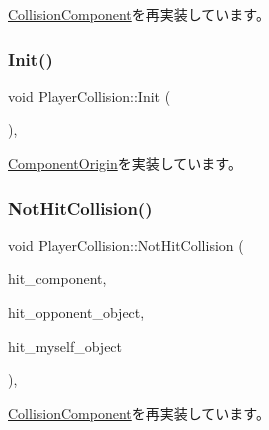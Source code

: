 \mbox{\hyperlink{class_collision_component_a7538567006556bc03524df2655e83956}{Collision\+Component}}を再実装しています。

\mbox{\label{class_player_collision_a3dd6238b75933fd60aee77e92353cc44}} 
\subsubsection{\texorpdfstring{Init()}{Init()}}
{\footnotesize\ttfamily void Player\+Collision\+::\+Init (\begin{DoxyParamCaption}{ }\end{DoxyParamCaption})\hspace{0.3cm}{\ttfamily [override]}, {\ttfamily [virtual]}}



\mbox{\hyperlink{class_component_origin_a9f674891257f2272b1636d8b6bb05d81}{Component\+Origin}}を実装しています。

\mbox{\label{class_player_collision_a46961b740806b7c467bb3384ff784b91}} 
\subsubsection{\texorpdfstring{Not\+Hit\+Collision()}{NotHitCollision()}}
{\footnotesize\ttfamily void Player\+Collision\+::\+Not\+Hit\+Collision (\begin{DoxyParamCaption}\item[{\mbox{\hyperlink{class_collision_component}{Collision\+Component}} $\ast$}]{hit\+\_\+component,  }\item[{\mbox{\hyperlink{class_collision_object}{Collision\+Object}} $\ast$}]{hit\+\_\+opponent\+\_\+object,  }\item[{\mbox{\hyperlink{class_collision_object}{Collision\+Object}} $\ast$}]{hit\+\_\+myself\+\_\+object }\end{DoxyParamCaption})\hspace{0.3cm}{\ttfamily [override]}, {\ttfamily [virtual]}}



\mbox{\hyperlink{class_collision_component_ad4d820d07872da11c9c1fd1b40157349}{Collision\+Component}}を再実装しています。

